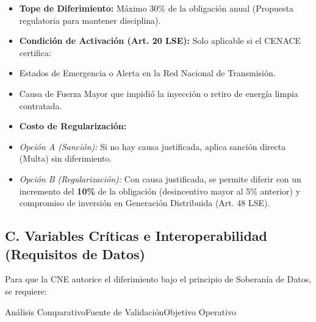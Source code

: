 \documentclass{cel}
\begin{document}
\begin{itemize}
\item \textbf{Tope de Diferimiento:} Máximo 30\% de la obligación anual (Propuesta regulatoria para mantener disciplina).
\item \textbf{Condición de Activación (Art. 20 LSE):} Solo aplicable si el CENACE certifica:
\item Estados de Emergencia o Alerta en la Red Nacional de Transmisión.
\item Causa de Fuerza Mayor que impidió la inyección o retiro de energía limpia contratada.
\item \textbf{Costo de Regularización:}
\item \textit{Opción A (Sanción):} Si no hay causa justificada, aplica sanción directa (Multa) sin diferimiento.
\item \textit{Opción B (Regularización):} Con causa justificada, se permite diferir con un incremento del \textbf{10\%} de la obligación (desincentivo mayor al 5\% anterior) y compromiso de inversión en Generación Distribuida (Art. 48 LSE).

\end{itemize}
\subsection{C. Variables Críticas e Interoperabilidad (Requisitos de Datos)}
\nopagebreak

Para que la CNE autorice el diferimiento bajo el principio de Soberanía de Datos, se requiere:


\vspace{0.3cm}
\begin{tablaParadigmaV2}{Análisis Comparativo}{Fuente de Validación}{Objetivo Operativo}
\end{tablaParadigmaV2}
\end{document}
